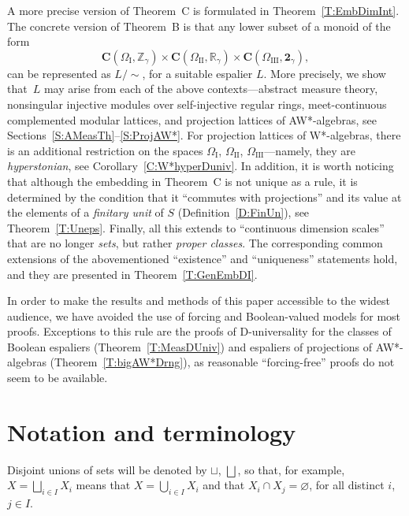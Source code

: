 \documentclass[psamsfonts,reqno]{memo-l}
\theoremstyle{plain}
\theoremstyle{definition}
\theoremstyle{remark}
\numberwithin{equation}{section}
\newcommand{\two}{\mathbf{2}}
\newcommand{\es}{\varnothing}
\newcommand{\CC}{\mathbf{C}}
\newcommand{\I}{\mathrm{I}}
\newcommand{\II}{\mathrm{II}}
\newcommand{\III}{\mathrm{III}}
\newcommand{\ZZ}{\mathbb{Z}}
\newcommand{\RR}{\mathbb{R}}
\begin{document}
A more precise version of Theorem~C is formulated in
Theorem~\ref{T:EmbDimInt}. The concrete version of Theorem~B is that any lower
subset of a monoid of the form
   \[
   \CC(\Omega_{\I},\ZZ_\gamma)\times\CC(\Omega_{\II},\RR_\gamma)
   \times\CC(\Omega_{\III},\two_\gamma),
   \]
can be represented as $L/{\sim}$, for a suitable espalier
$L$. More precisely, we show that~$L$ may arise from each of the above
contexts---abstract measure theory, nonsingular injective modules over
self-injective regular rings,
%
meet-continuous complemented modular lattices,
and projection lattices of
AW*-algebras, see Sections~\ref{S:AMeasTh}--\ref{S:ProjAW*}. For projection
lattices of W*-algebras, there is an additional
restriction on the spaces $\Omega_{\I}$, $\Omega_{\II}$,
$\Omega_{\III}$---namely, they are
\emph{hyperstonian}, see
Corollary~\ref{C:W*hyperDuniv}. In addition, it is worth noticing that
although the embedding in Theorem~C is not unique as a rule, it is
determined by the condition that it ``commutes with projections'' and its
value at the elements of a \emph{finitary unit} of $S$
(Definition~\ref{D:FinUn}), see Theorem~\ref{T:Uneps}. Finally, all this
extends to ``continuous dimension scales'' that are no
longer \emph{sets}, but rather \emph{proper classes}. The corresponding
common extensions of the abovementioned ``existence'' and ``uniqueness''
statements hold, and they are presented in Theorem~\ref{T:GenEmbDI}.

In order to make the results and methods of this paper accessible to the
widest audience, we have avoided the use of forcing and Boolean-valued
models for most proofs. Exceptions to this rule are the proofs of
D-universality for the classes of Boolean
espaliers (Theorem~\ref{T:MeasDUniv}) and
espaliers of projections of AW*-algebras
(Theorem~\ref{T:bigAW*Drng}), as reasonable ``forcing-free'' proofs do not
seem to be available.

\section{Notation and terminology}\label{S:NotTerm}

Disjoint unions of sets will be denoted by $\sqcup$, $\bigsqcup$,
 so that, for
example, $X=\bigsqcup_{i\in I}X_i$ means that $X=\bigcup_{i\in I}X_i$ and
that $X_i\cap X_j=\es$, for all distinct $i$, $j\in I$.
\end{document}
